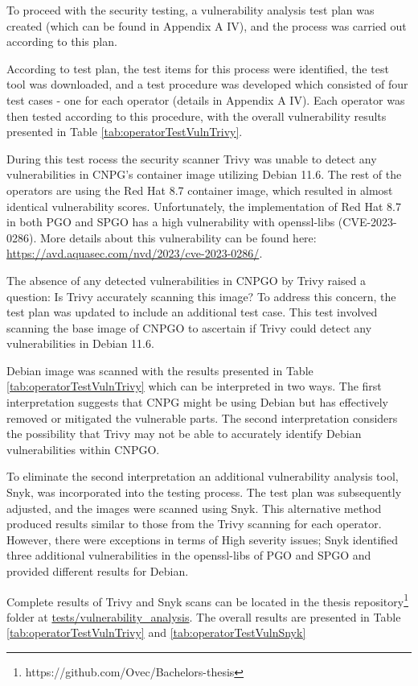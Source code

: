 To proceed with the security testing, a vulnerability analysis test plan was created (which can be found in Appendix A IV), and the process was carried out according to this plan.

According to test plan, the test items for this process were identified, the test tool was downloaded, and a test procedure was developed which consisted of four test cases - one for each operator (details in Appendix A IV).
Each operator was then tested according to this procedure, with the overall vulnerability results presented in Table \ref{tab:operatorTestVulnTrivy}.

During this test rocess the security scanner Trivy was unable to detect any vulnerabilities in CNPG's container image utilizing Debian 11.6.
The rest of the operators are using the Red Hat 8.7 container image, which resulted in almost identical vulnerability scores.
Unfortunately, the implementation of Red Hat 8.7 in both PGO and SPGO has a high vulnerability with openssl-libs (CVE-2023-0286).
More details about this vulnerability can be found here: \url{https://avd.aquasec.com/nvd/2023/cve-2023-0286/}.

The absence of any detected vulnerabilities in CNPGO by Trivy raised a question: Is Trivy accurately scanning this image? To address this concern, the test plan was updated to include an additional test case.
This test involved scanning the base image of CNPGO to ascertain if Trivy could detect any vulnerabilities in Debian 11.6.

Debian image was scanned with the results presented in Table \ref{tab:operatorTestVulnTrivy} which can be interpreted in two ways. The first interpretation suggests that CNPG might be using Debian but has effectively removed or mitigated the vulnerable parts. The second interpretation considers the possibility that Trivy may not be able to accurately identify Debian vulnerabilities within CNPGO.

To eliminate the second interpretation an additional vulnerability analysis tool, Snyk, was incorporated into the testing process. The test plan was subsequently adjusted, and the images were scanned using Snyk. This alternative method produced results similar to those from the Trivy scanning for each operator. However, there were exceptions in terms of High severity issues;
Snyk identified three additional vulnerabilities in the openssl-libs of PGO and SPGO and provided different results for Debian.

Complete results of Trivy and Snyk scans can be located in the thesis repository\footnote[6]{https://github.com/Ovec/Bachelors-thesis} folder at \url{tests/vulnerability_analysis}. The overall results are presented in Table \ref{tab:operatorTestVulnTrivy} and \ref{tab:operatorTestVulnSnyk}

